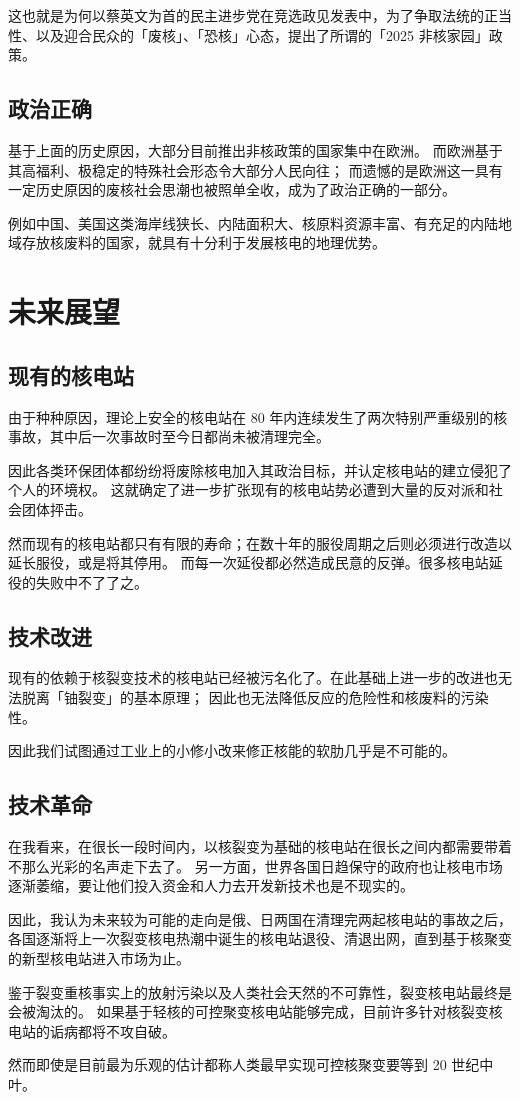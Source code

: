 这也就是为何以蔡英文为首的民主进步党在竞选政见发表中，为了争取法统的正当性、以及迎合民众的「废核」、「恐核」心态，提出了所谓的「2025 非核家园」政策\cite{hemx1}。

\section{政治正确}

基于上面的历史原因，大部分目前推出非核政策的国家集中在欧洲。
而欧洲基于其高福利、极稳定的特殊社会形态令大部分人民向往；
而遗憾的是欧洲这一具有一定历史原因的废核社会思潮也被照单全收，成为了政治正确的一部分\cite{hemx2}。

例如中国、美国这类海岸线狭长、内陆面积大、核原料资源丰富、有充足的内陆地域存放核废料的国家，就具有十分利于发展核电的地理优势。

\chapter{未来展望}

\section{现有的核电站}

由于种种原因，理论上安全的核电站在 80 年内连续发生了两次特别严重级别的核事故，其中后一次事故时至今日都尚未被清理完全。

因此各类环保团体都纷纷将废除核电加入其政治目标，并认定核电站的建立侵犯了个人的环境权。
这就确定了进一步扩张现有的核电站势必遭到大量的反对派和社会团体抨击\cite{hemx1}。

然而现有的核电站都只有有限的寿命；在数十年的服役周期之后则必须进行改造以延长服役，或是将其停用。
而每一次延役都必然造成民意的反弹。很多核电站延役的失败中不了了之\cite{iwt}。

\section{技术改进}

现有的依赖于核裂变技术的核电站已经被污名化了。在此基础上进一步的改进也无法脱离「铀裂变」的基本原理；
因此也无法降低反应的危险性和核废料的污染性。

因此我们试图通过工业上的小修小改来修正核能的软肋几乎是不可能的。

\section{技术革命}

在我看来，在很长一段时间内，以核裂变为基础的核电站在很长之间内都需要带着不那么光彩的名声走下去了。
另一方面，世界各国日趋保守的政府也让核电市场逐渐萎缩，要让他们投入资金和人力去开发新技术也是不现实的。

因此，我认为未来较为可能的走向是俄、日两国在清理完两起核电站的事故之后，
各国逐渐将上一次裂变核电热潮中诞生的核电站退役、清退出网，直到基于核聚变的新型核电站进入市场为止。

鉴于裂变重核事实上的放射污染以及人类社会天然的不可靠性，裂变核电站最终是会被淘汰的。
如果基于轻核的可控聚变核电站能够完成，目前许多针对核裂变核电站的诟病都将不攻自破。

然而即使是目前最为乐观的估计都称人类最早实现可控核聚变要等到 20 世纪中叶。
